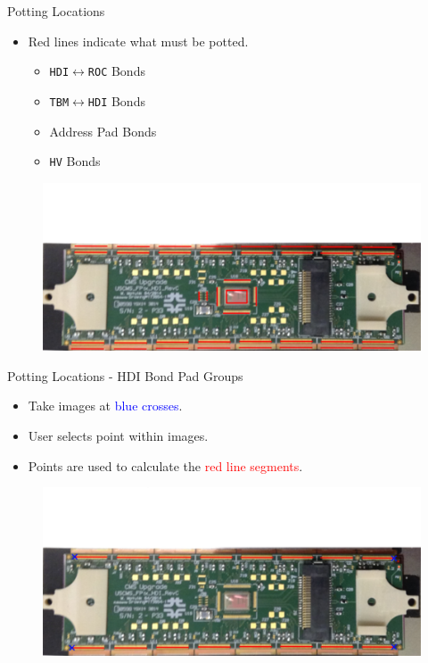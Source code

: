 \documentclass{beamer}
\begin{document}
\begin{frame}{Potting Locations}
\begin{itemize}
    \item \alert{Red} lines indicate what must be potted.
    \begin{itemize}
        \item \texttt{HDI}$\longleftrightarrow$\texttt{ROC} Bonds
        \item \texttt{TBM}$\longleftrightarrow$\texttt{HDI} Bonds
        \item Address Pad Bonds
        \item \texttt{HV} Bonds
    \end{itemize}
\end{itemize}
\begin{figure}
    \centering
    \includegraphics[width=\textwidth]{"figures/Module Annotated - All"}
    \label{fig:module_annotated_all}
\end{figure}
\vspace{4cm}
\end{frame}

\begin{frame}{Potting Locations - HDI Bond Pad Groups}
\begin{itemize}
    \item Take images at \textcolor{blue}{blue crosses}.
    \item User selects point within images.
    \item Points are used to calculate the \textcolor{red}{red line segments}.
\end{itemize}
\begin{figure}
    \centering
    \includegraphics[width=\textwidth]{"figures/Module Annotated - Bond Pads HDI"}
    \label{fig:module_annotated_bond_pads_hdi}
\end{figure}
\vspace{4cm}
\end{frame}
\end{document}

